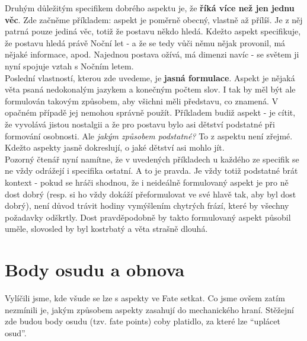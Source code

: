 \documentclass[../main.tex]{subfiles}
\begin{document}
Druhým důležitým specifikem dobrého aspektu je, že \textbf{říká více než jen jednu věc}. Zde začněme příkladem: aspekt  je poměrně obecný, vlastně až přílíš. Je z něj patrná pouze jediná věc, totiž že postavu někdo hledá. Kdežto aspekt  specifikuje, že postavu hledá právě Noční let - a že se tedy vůči němu nějak provonil, má nějaké informace, apod. Najednou postava ožívá, má dimenzi navíc - se světem ji nyní spojuje vztah s Nočním letem. \\

Poslední vlastností, kterou zde uvedeme, je \textbf{jasná formulace}. Aspekt je nějaká věta psaná nedokonalým jazykem a konečným počtem slov. I tak by měl být ale formulován takovým způsobem, aby všichni měli představu, co znamená. V opačném případě jej nemohou správně použít. Příkladem budiž aspekt  - je cítit, že vyvolává jistou nostalgii a že pro postavu bylo asi dětství podstatné při formování osobnosti. Ale \emph{jakým způsobem podstatné?} To z aspektu není zřejmé. Kdežto aspekty  jasně dokreslují, o jaké dětství asi mohlo jít.\\

Pozorný čtenář nyní namítne, že v uvedených příkladech u každého ze specifik se ne vždy odrážejí i specifika ostatní. A to je pravda. Je vždy totiž podstatné brát kontext - pokud se hráči shodnou, že i neideálně formulovaný aspekt je pro ně dost dobrý (resp. si ho vždy dokáží přeformulovat ve své hlavě tak, aby byl dost dobrý), není důvod trávit hodiny vymýšlením chytrých frází, které by všechny požadavky odškrtly. Dost pravděpodobně by takto formulovaný aspekt působil uměle, slovosled by byl kostrbatý a věta strašně dlouhá.

\section{Body osudu a obnova}
\label{sec:body-osudu-obnova}

Vylíčili jsme, kde všude se lze s aspekty ve Fate setkat. Co jsme ovšem zatím nezmínili je, jakým způsobem aspekty zasahují do mechanického hraní. Stěžejní zde budou body osudu (tzv. fate points) coby platidlo, za které lze ``uplácet osud''. \\
\end{document}
